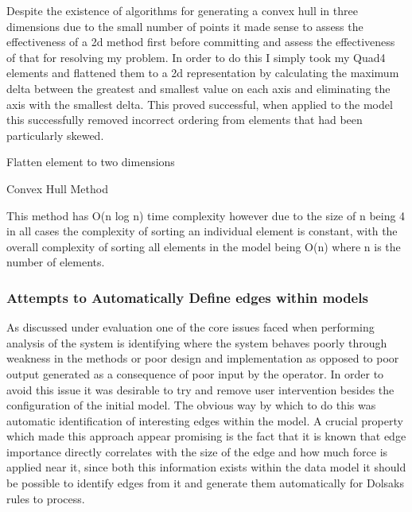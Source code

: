 \documentclass{article}
\begin{document}
\noindent
Despite the existence of algorithms for generating a convex hull in three dimensions due to the small number of points it made sense to assess the effectiveness of a 2d method first before committing and assess the effectiveness of that for resolving my problem. In order to do this I simply took my Quad4 elements and flattened them to a 2d representation by calculating the maximum delta between the greatest and smallest value on each axis and eliminating the axis with the smallest delta. This proved successful, when applied to the model this successfully removed incorrect ordering from elements that had been particularly skewed. \\ 
	
\begin{algorithm}[H]
 Flatten element to two dimensions\;
\caption{Convex Hull Method}

\end{algorithm}

\noindent
This method has O(n log n) time complexity however due to the size of n being 4 in all cases the complexity of sorting an individual element is constant, with the overall complexity of sorting all elements in the model being O(n) where n is the number of elements.

\subsubsection{Attempts to Automatically Define edges within models}
As discussed under evaluation one of the core issues faced when performing analysis of the system is identifying where the system behaves poorly through weakness in the methods or poor design and implementation as opposed to poor output generated as a consequence of poor input by the operator. In order to avoid this issue it was desirable to try and remove user intervention besides the configuration of the initial model. The obvious way by which to do this was automatic identification of interesting edges within the model. A crucial property which made this approach appear promising is the fact that it is known that edge importance directly correlates with the size of the edge and how much force is applied near it, since both this information exists within the data model it should be possible to identify edges from it and generate them automatically for Dolsaks rules to process.
\end{document}
